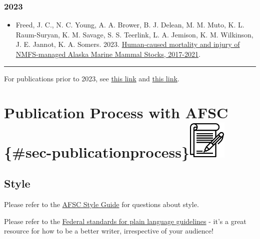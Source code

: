 \documentclass[
  letterpaper,
  DIV=11,
  numbers=noendperiod]{scrreprt}
\providecommand{\tightlist}{%
  \setlength{\itemsep}{0pt}\setlength{\parskip}{0pt}}\usepackage{longtable,booktabs,array}
\begin{document}
\subsection{2023}\label{section-3}

\begin{itemize}
\tightlist
\item
  Freed, J. C., N. C. Young, A. A. Brower, B. J. Delean, M. M. Muto, K.
  L. Raum-Suryan, K. M. Savage, S. S. Teerlink, L. A. Jemison, K. M.
  Wilkinson, J. E. Jannot, K. A. Somers. 2023.
  \href{https://doi.org/10.25923/rpkz-pb10}{Human-caused mortality and
  injury of NMFS-managed Alaska Marine Mammal Stocks, 2017-2021}.
\end{itemize}

\begin{center}\rule{0.5\linewidth}{0.5pt}\end{center}

For publications prior to 2023, see
\href{https://repository.library.noaa.gov/gsearch?terms=Alaska+Fisheries+Monitoring+and+Analysis+Division}{this
link} and
\href{https://apps-afsc.fisheries.noaa.gov/pubs/pubs_results.php}{this
link}.


\chapter[Publication Process with AFSC
\{\#sec-publicationprocess\}]{\texorpdfstring{Publication Process with
AFSC
\{\#sec-publicationprocess\}\protect\includegraphics[width=\textwidth,height=0.72917in]{_img/contract.png}}{Publication Process with AFSC \{\#sec-publicationprocess\}}}\label{publication-process-with-afsc-sec-publicationprocess}

\section{Style}\label{style}

Please refer to the
\href{https://drive.google.com/file/d/0B-F6OHsoRmTkX2x6cXZ3NWwzeFE/view?resourcekey=0-PULR1VmB2gVOuSMDW-YAQA}{AFSC
Style Guide} for questions about style.

Please refer to the
\href{https://www.plainlanguage.gov/media/FederalPLGuidelines.pdf}{Federal
standards for plain language guidelines} - it's a great resource for how
to be a better writer, irrespective of your audience!
\end{document}
